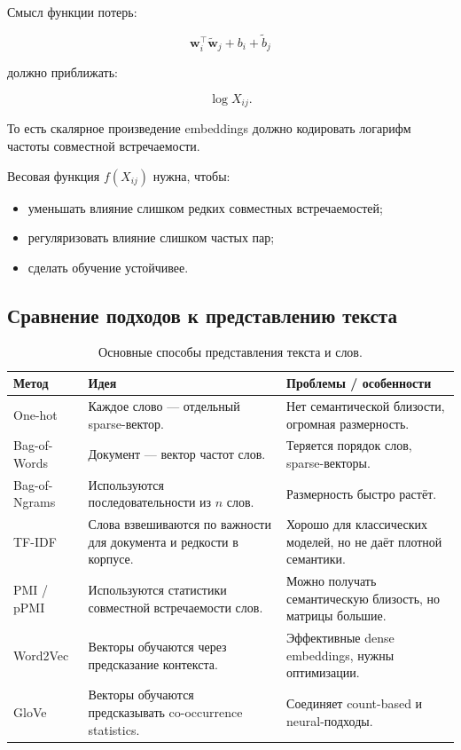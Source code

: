 \documentclass[a4paper,12pt]{article}
\begin{document}
Смысл функции потерь:

\[
\bm{w}_i^\top \tilde{\bm{w}}_j
+
b_i
+
\tilde{b}_j
\]

должно приближать:

\[
\log X_{ij}.
\]

То есть скалярное произведение embeddings должно кодировать логарифм частоты совместной встречаемости.

Весовая функция \(f(X_{ij})\) нужна, чтобы:

\begin{itemize}
    \item уменьшать влияние слишком редких совместных встречаемостей;
    \item регуляризовать влияние слишком частых пар;
    \item сделать обучение устойчивее.
\end{itemize}

\subsection{Сравнение подходов к представлению текста}

\begin{table}[H]
\centering
\begin{tabular}{p{} p{} p{}}
\toprule
\textbf{Метод} & \textbf{Идея} & \textbf{Проблемы / особенности} \\
\midrule

One-hot &
Каждое слово --- отдельный sparse-вектор. &
Нет семантической близости, огромная размерность. \\

Bag-of-Words &
Документ --- вектор частот слов. &
Теряется порядок слов, sparse-векторы. \\

Bag-of-Ngrams &
Используются последовательности из \(n\) слов. &
Размерность быстро растёт. \\

TF-IDF &
Слова взвешиваются по важности для документа и редкости в корпусе. &
Хорошо для классических моделей, но не даёт плотной семантики. \\

PMI / pPMI &
Используются статистики совместной встречаемости слов. &
Можно получать семантическую близость, но матрицы большие. \\

Word2Vec &
Векторы обучаются через предсказание контекста. &
Эффективные dense embeddings, нужны оптимизации. \\

GloVe &
Векторы обучаются предсказывать co-occurrence statistics. &
Соединяет count-based и neural-подходы. \\

\bottomrule
\end{tabular}
\caption{Основные способы представления текста и слов.}
\end{table}
\end{document}
